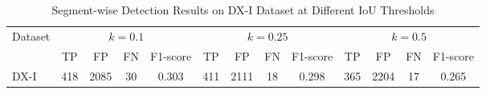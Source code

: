 
\begin{table}[h]
\centering
\caption{Segment-wise Detection Results on DX-I Dataset at Different IoU Thresholds}
\label{tab:results}
\begin{tabular}{l|cccc|cccc|cccc}
\hline
\multirow{2}{*}{Dataset} & \multicolumn{4}{c|}{$k = 0.1$} & \multicolumn{4}{c|}{$k = 0.25$} & \multicolumn{4}{c}{$k = 0.5$} \\
& TP & FP & FN & F1-score & TP & FP & FN & F1-score & TP & FP & FN & F1-score \\
\hline
DX-I & 418 & 2085 & 30 & 0.303 & 411 & 2111 & 18 & 0.298 & 365 & 2204 & 17 & 0.265 \\
\hline
\end{tabular}
\end{table}
